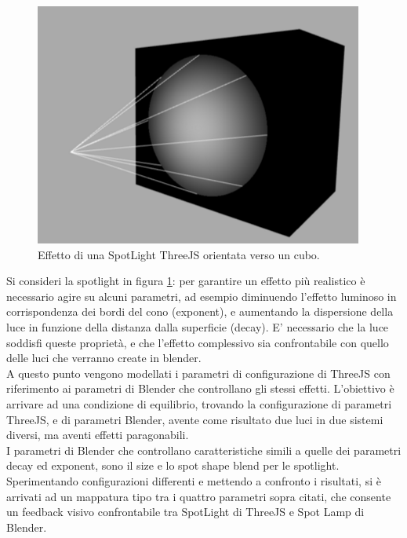 \begin{figure}[htb]
 \centering
 \includegraphics[width=1\linewidth]{images/chapter_baking_service/ba_se_ex_cubo.png}\hfill
 \caption[SpotLight ThreeJS]{Effetto di una SpotLight ThreeJS orientata verso un cubo.}
 \label{fig:ba_se_ex_cubo}
\end{figure}
Si consideri la spotlight in figura \ref{fig:ba_se_ex_cubo}:
per garantire un effetto più realistico è necessario agire su alcuni parametri, ad esempio diminuendo l’effetto luminoso in corrispondenza dei bordi del cono (exponent), e aumentando la dispersione della luce in funzione della distanza dalla superficie (decay). E’ necessario che la luce soddisfi queste proprietà, e che l’effetto complessivo sia confrontabile con quello delle luci che verranno create in blender.
\\ 
A questo punto vengono modellati i parametri di configurazione di ThreeJS con riferimento ai parametri di Blender che controllano gli stessi effetti. L’obiettivo è arrivare ad una condizione di equilibrio, trovando la configurazione di parametri ThreeJS, e di parametri Blender, avente come risultato due luci in due sistemi diversi, ma aventi effetti paragonabili.
\\
I parametri di Blender che controllano caratteristiche simili a quelle dei parametri decay ed exponent, sono il size e lo spot shape blend per le spotlight.
\\ 
Sperimentando configurazioni differenti e mettendo a confronto i risultati, si è arrivati ad un mappatura tipo tra i quattro parametri sopra citati, che consente un feedback visivo confrontabile tra SpotLight di ThreeJS e Spot Lamp di Blender.
